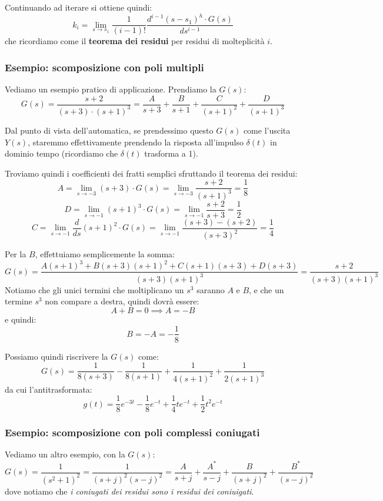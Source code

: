 \documentclass[a4paper,11pt]{article}
\begin{document}
Continuando ad iterare si ottiene quindi:
$$
k_i = \lim_{s \rightarrow s_1} \frac{1}{(i - 1)!} \frac{d^{i - 1} (s - s_1)^h \cdot G(s) }{ds^{i - 1}}
$$
che ricordiamo come il \textbf{teorema dei residui} per residui di molteplicità $i$.

\subsubsection{Esempio: scomposizione con poli multipli}
Vediamo un esempio pratico di applicazione.
Prendiamo la $G(s)$:
$$
G(s) = \frac{s + 2}{(s + 3) \cdot (s + 1)^3} = \frac{A}{s + 3} + \frac{B}{s + 1} + \frac{C}{(s + 1)^2} + \frac{D}{(s + 1)^3}
$$

Dal punto di vista dell'automatica, se prendessimo questo $G(s)$ come l'uscita $Y(s)$, staremmo effettivamente prendendo la risposta all'impulso $\delta(t)$ in dominio tempo (ricordiamo che $\delta(t)$ trasforma a 1).

Troviamo quindi i coefficienti dei fratti semplici sfruttando il teorema dei residui:
$$
A = \lim_{s \rightarrow -3} (s + 3) \cdot G(s) = \lim_{s \rightarrow -3} \frac{s + 2}{(s + 1)^3} = \frac{1}{8}
$$
$$
D = \lim_{s \rightarrow -1} (s + 1)^3 \cdot G(s) = \lim_{s \rightarrow -1} \frac{s + 2}{s + 3} = \frac{1}{2} 
$$
$$
C = \lim_{s \rightarrow -1} \frac{d}{ds} (s + 1)^2 \cdot G(s) = \lim_{s \rightarrow -1} \frac{(s + 3) - (s + 2)}{(s + 3)^2} = \frac{1}{4}
$$

Per la $B$, effettuiamo semplicemente la somma:
$$
G(s) = \frac{A(s + 1)^3 + B(s + 3)(s + 1)^2 + C(s + 1)(s + 3) + D(s+3)}{(s + 3)(s + 1)^3} = \frac{s + 2}{(s + 3)(s + 1)^3}
$$
Notiamo che gli unici termini che moltiplicano un $s^3$ saranno $A$ e $B$, e che un termine $s^3$ non compare a destra, quindi dovrà essere:
$$
A + B = 0 \implies A = -B
$$
e quindi:
$$
B = -A = -\frac{1}{8}
$$

Possiamo quindi riscrivere la $G(s)$ come:
$$
G(s) = \frac{1}{8(s + 3)} - \frac{1}{8(s + 1)} + \frac{1}{4(s + 1)^2} + \frac{1}{2(s + 1)^3}
$$
da cui l'antitrasformata:
$$
g(t) = \frac{1}{8}e^{-3t} -\frac{1}{8}e^{-t} + \frac{1}{4} t e^{-t} + \frac{1}{2} t^2 e^{-t}
$$


\subsubsection{Esempio: scomposizione con poli complessi coniugati}
Vediamo un altro esempio, con la $G(s)$:
$$
G(s) = \frac{1}{(s^2 + 1)^2} = \frac{1}{(s + j)^2 (s - j)^2} = \frac{A}{s + j}+ \frac{A^*}{s - j} + \frac{B}{(s + j)^2} + \frac{B^*}{(s - j)^2}
$$
dove notiamo che \textit{i coniugati dei residui sono i residui dei coniuigati}.
\end{document}
